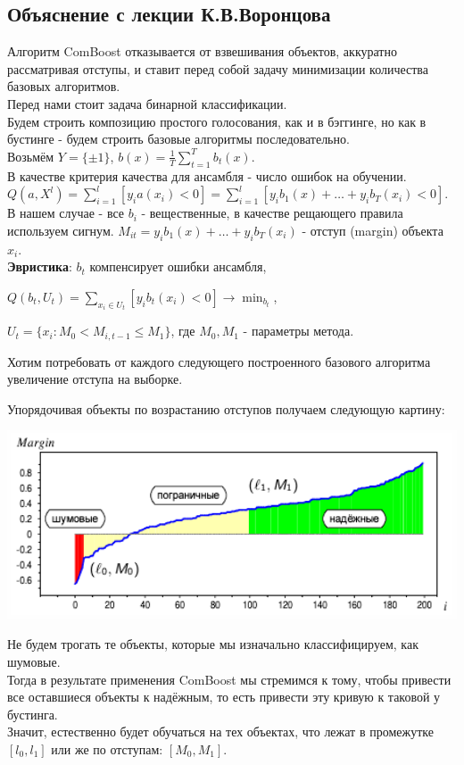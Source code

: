\subsection{Объяснение с лекции К.В.Воронцова}
Алгоритм ComBoost отказывается от взвешивания объектов, аккуратно рассматривая отступы, и ставит перед собой задачу минимизации количества базовых алгоритмов. \\
Перед нами стоит задача бинарной классификации. \\
Будем строить композицию простого голосования, как и в бэггинге, но как в бустинге - будем строить базовые алгоритмы последовательно. \\
Возьмём $Y = \{\pm1\}$, $b(x) = \frac{1}{T}\sum_{t=1}^{T}b_t(x)$.\\
В качестве критерия качества для ансамбля - число ошибок на обучении.\\
$Q(a,X^l) = \sum_{i=1}^{l}[y_ia(x_i) < 0] = \sum_{i=1}^{l}[y_ib_1(x) + \dots + y_ib_T(x_i) < 0]$. \\
В нашем случае - все $b_i$ - вещественные, в качестве рещающего правила используем сигнум.
$M_{it} = y_ib_1(x) + \dots + y_ib_T(x_i)$ - отступ (margin) объекта $x_i$. \\
\textbf{Эвристика}: $b_t$ компенсирует ошибки ансамбля, \\
\begin{center}
    $Q(b_t, U_t) = \sum_{x_i \in U_t}[y_ib_t(x_i) < 0] \rightarrow \min_{b_t}$,
\end{center}
$U_t = \{x_i : M_0 < M_{i,t-1} \leq M_1\}$, где $M_0, M_1$ - параметры метода.

Хотим потребовать от каждого следующего построенного базового алгоритма увеличение отступа на выборке.

Упорядочивая объекты по возрастанию отступов получаем следующую картину:

\includegraphics[width=15cm]{chapters/boosting/images/item_classes.png}

Не будем трогать те объекты, которые мы изначально классифицируем, как шумовые. \\
Тогда в результате применения ComBoost мы стремимся к тому, чтобы привести все оставшиеся объекты к надёжным, то есть привести эту кривую к таковой у бустинга. \\
Значит, естественно будет обучаться на тех объектах, что лежат в промежутке $[l_0, l_1]$ или же по отступам: $[M_0, M_1]$. \\

